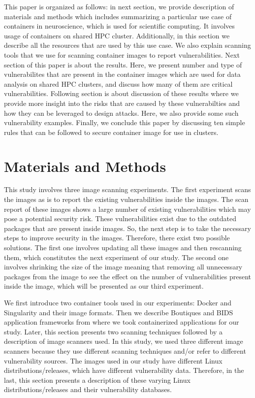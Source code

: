 \documentclass[a4paper,num-refs]{oup-contemporary}
\begin{document}
This paper is organized as follows: in next section, we provide description
of materials and methods which includes summarizing a particular use case of
containers in neuroscience, which is used for scientific computing. It involves
usage of containers on shared HPC cluster. Additionally, in this section we
describe all the resources that are used by this use case. We also explain
scanning tools that we use for scanning container images to report
vulnerabilities. Next section of this paper is about the results. Here, we
present number and type of vulnerabilites that are present in the container images
which are used for data analysis on shared HPC clusters, and discuss how many of them are
critical vulnerabilities. Following section is about discussion of these results
where we provide more insight into the risks that are caused by these vulnerabilties
and how they can be leveraged to design attacks. Here, we also provide some such
vulnerability examples. Finally, we conclude this paper by discussing ten simple
rules that can be followed to secure container image for use in clusters.

\section{Materials and Methods}

This study involves three image scanning experiments.
The first experiment scans the images as is to report the existing vulnerabilities
inside the images. The scan report of
these images shows a large number of existing vulnerabilities which may pose
a potential security risk. These vulnerabilities exist due to the outdated
packages that are present inside images. So, the next step is to
take the necessary steps to improve security in the images. Therefore, there exist
two possible solutions.
The first one involves updating
all these images and then rescanning them, which constitutes the next experiment of our study. The second one
involves shrinking the size of the image
meaning that removing all unnecessary packages from the image to see the effect on the number of
vulnerabilities present inside the image, which will be presented as our third experiment.

We first
introduce two container tools used in our experiments: Docker and
Singularity and their image formats. Then we describe Boutiques and BIDS application frameworks
from where we took containerized applications for our study. 
Later, this section
presents two scanning techniques followed by a description of image scanners used.
In this study, we used three different image scanners because they
use different scanning techniques and/or refer to different vulnerability sources.
The images used in our study have different Linux distributions/releases, which have
different vulnerability data. Therefore, in the last, this section presents a
description of these varying Linux distributions/releases and their
vulnerability databases.
\end{document}
